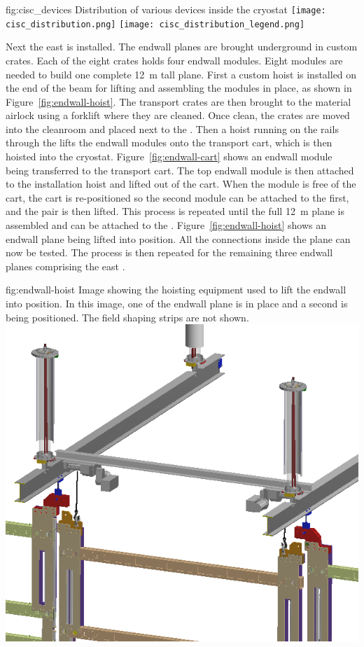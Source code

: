 \begin{dunefigure}{fig:cisc_devices}
  {Distribution of various %
   devices inside the cryostat}
  \texttt{[image: cisc\_distribution.png]}
  \texttt{[image: cisc\_distribution\_legend.png]}
\end{dunefigure}

\clearpage



Next the east  is installed. The endwall planes are brought underground in custom crates. Each of the eight crates holds four endwall modules.  Eight modules are needed to build one complete \SI{12}{m} tall plane.  First a custom hoist is installed on the end of the  beam for lifting and assembling the modules in place, as shown in Figure~\ref{fig:endwall-hoist}. The  transport crates are then brought to the material airlock using a forklift where they are cleaned.  Once clean, the crates are moved into the cleanroom and placed next to the . Then a hoist running on the rails through the  lifts the endwall modules onto the transport cart, which is then hoisted into the cryostat. Figure~\ref{fig:endwall-cart} shows an endwall module being transferred to the transport cart. The top endwall module is then attached to the installation hoist and lifted out of the cart. When the module is free of  the cart, the cart is re-positioned so the second module can be attached to the first, and the pair is then lifted. This process is repeated until the full \SI{12}{m}  plane is assembled and can be attached to the . 
Figure~\ref{fig:endwall-hoist} shows an endwall plane being lifted into position.
All the  connections inside the plane can now be tested. The process is then repeated for the remaining three endwall planes comprising the east  . 
 
 \begin{dunefigure}{fig:endwall-hoist}
  {Image showing the hoisting equipment used to lift the endwall into position. In this image, one of the endwall plane is in place and a second is being positioned. The field shaping strips are not shown.}
\includegraphics[width=.5\textwidth]{graphics/endwall-hoist.png}
\end{dunefigure}
 
